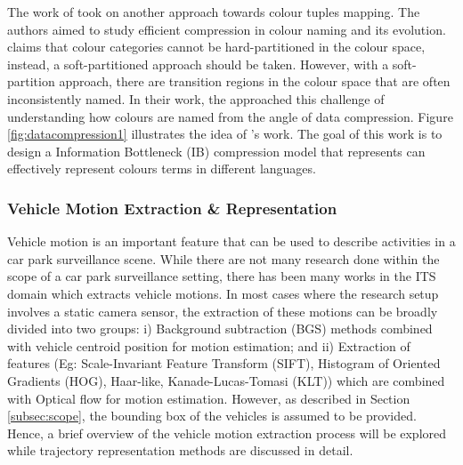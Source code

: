 The work of \cite{zaslavsky2018efficient} took on another approach towards colour tuples mapping. The authors aimed to study efficient compression in colour naming and its evolution.  claims that colour categories cannot be hard-partitioned in the colour space, instead, a soft-partitioned approach should be taken. However, with a soft-partition approach, there are transition regions in the colour space that are often inconsistently named. 
In their work, the approached this challenge of understanding how colours are named from the angle of data compression. Figure \ref{fig:datacompression1} illustrates the idea of 's work. The goal of this work is to design a Information Bottleneck (IB) compression model that represents can effectively represent colours terms in different languages. 

\subsubsection{Vehicle Motion Extraction \& Representation}
\label{subsec:vehiclemotionextraction}

Vehicle motion is an important feature that can be used to describe activities in a car park surveillance scene. While there are not many research done within the scope of a car park surveillance setting, there has been many works in the ITS domain which extracts vehicle motions. In most cases where the research setup involves a static camera sensor, the extraction of these motions can be broadly divided into two groups: i) Background subtraction (BGS) methods combined with vehicle centroid position for motion estimation; and ii) Extraction of features (Eg: Scale-Invariant Feature Transform (SIFT), Histogram of Oriented Gradients (HOG), Haar-like, Kanade-Lucas-Tomasi (KLT)) which are combined with Optical flow for motion estimation. 
However, as described in Section \ref{subsec:scope}, the bounding box of the vehicles is assumed to be provided.
Hence, a brief overview of the vehicle motion extraction process will be explored while trajectory representation methods are discussed in detail. 



